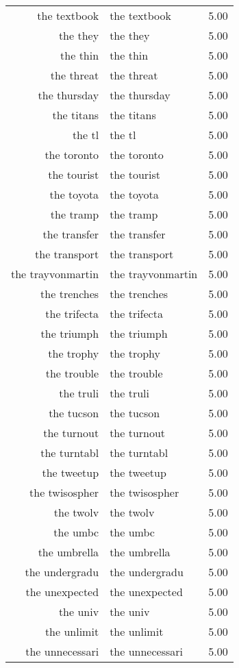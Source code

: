 \begin{table}[ht]
\begin{tabular}{rlr}
  the textbook & the textbook & 5.00 \\ 
  the they & the they & 5.00 \\ 
  the thin & the thin & 5.00 \\ 
  the threat & the threat & 5.00 \\ 
  the thursday & the thursday & 5.00 \\ 
  the titans & the titans & 5.00 \\ 
  the tl & the tl & 5.00 \\ 
  the toronto & the toronto & 5.00 \\ 
  the tourist & the tourist & 5.00 \\ 
  the toyota & the toyota & 5.00 \\ 
  the tramp & the tramp & 5.00 \\ 
  the transfer & the transfer & 5.00 \\ 
  the transport & the transport & 5.00 \\ 
  the trayvonmartin & the trayvonmartin & 5.00 \\ 
  the trenches & the trenches & 5.00 \\ 
  the trifecta & the trifecta & 5.00 \\ 
  the triumph & the triumph & 5.00 \\ 
  the trophy & the trophy & 5.00 \\ 
  the trouble & the trouble & 5.00 \\ 
  the truli & the truli & 5.00 \\ 
  the tucson & the tucson & 5.00 \\ 
  the turnout & the turnout & 5.00 \\ 
  the turntabl & the turntabl & 5.00 \\ 
  the tweetup & the tweetup & 5.00 \\ 
  the twisospher & the twisospher & 5.00 \\ 
  the twolv & the twolv & 5.00 \\ 
  the umbc & the umbc & 5.00 \\ 
  the umbrella & the umbrella & 5.00 \\ 
  the undergradu & the undergradu & 5.00 \\ 
  the unexpected & the unexpected & 5.00 \\ 
  the univ & the univ & 5.00 \\ 
  the unlimit & the unlimit & 5.00 \\ 
  the unnecessari & the unnecessari & 5.00 \\ 

\end{tabular}
\end{table}

